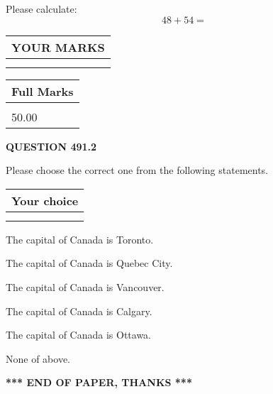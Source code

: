 \documentclass[12pt]{article}
\begin{document}
  
 
Please calculate:
\begin{equation}
48 +  %
54 = \nonumber
\end{equation}
 

 

 
  
\vspace{0.2in}
  
\noindent\begin{tabular}{|l|}
\hline
 YOUR MARKS  \\
\hline
 \\ 
 \\ 
\hline
\end{tabular}
\hspace{0.05in} \begin{tabular}{|l|}
\hline
 Full Marks  \\
\hline
 \\ 
50.00 \\
\hline
\end{tabular}
{\textbf{\Large{QUESTION
491.2 
}}}
  
  
Please choose the correct one from the following statements.
  
  
\noindent\hspace{3.0in} \begin{tabular}{|l|}
\hline
Your choice \\
\hline
 \\ 
 \\ 
\hline
\end{tabular}
  
  
 
 
The capital of Canada is Toronto.
 
 
The capital of Canada is Quebec City.
 
 
The capital of Canada is Vancouver.
 
 
The capital of Canada is Calgary.
 
 
The capital of Canada is Ottawa.
 
 
 None of above.
 
 
   
   
 \vspace{0.2in}
 
   
   
   
   
\vspace{1.0in} 
{\textbf{\large{ *** END OF PAPER, THANKS *** }}} 
   
\end{document}
